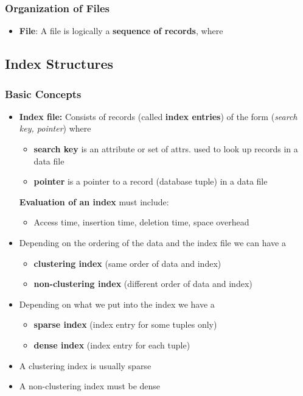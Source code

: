 \subsubsection{Organization of Files}
\begin{itemize}[label=\(\rhd\)]
    \item \textbf{File}: A file is logically a \textbf{sequence of records}, where
\end{itemize}

\subsection{Index Structures}

\subsubsection{Basic Concepts}
\begin{itemize}[label=\(\rhd\)]
    \item \textbf{Index file:} Consists of records (called \textbf{index entries}) of the form (\textit{search key, pointer}) where
    \begin{itemize}[label=\(\rhd\)]
        \item \textbf{search key} is an attribute or set of attrs. used to look up records in a data file
        \item \textbf{pointer} is a pointer to a record (database tuple) in a data file
    \end{itemize}
    \textbf{Evaluation of an index} must include:
    \begin{itemize}[label=\(\rhd\)]
        \item Access time, insertion time, deletion time, space overhead
    \end{itemize}
    \item Depending on the ordering of the data and the index file we can have a 
    \begin{itemize}[label=\(\rhd\)]
        \item \textbf{clustering index} (same order of data and index)
        \item \textbf{non-clustering index} (different order of data and index)
    \end{itemize}
    \item Depending on what we put into the index we have a 
    \begin{itemize}[label=\(\rhd\)]
        \item \textbf{sparse index} (index entry for some tuples only)
        \item \textbf{dense index} (index entry for each tuple)
    \end{itemize}
    \item A clustering index is usually sparse
    \item A non-clustering index must be dense
\end{itemize}

